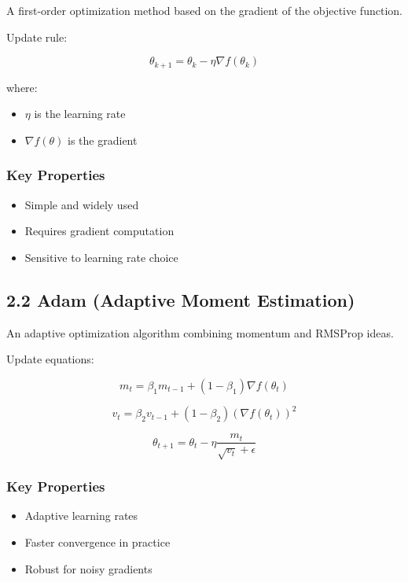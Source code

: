 A first-order optimization method based on the gradient of the objective function.

Update rule:

\[
\theta_{k+1} = \theta_k - \eta \nabla f(\theta_k)
\]

where:
\begin{itemize}
\item $\eta$ is the learning rate
\item $\nabla f(\theta)$ is the gradient
\end{itemize}

\subsubsection*{Key Properties}

\begin{itemize}
\item Simple and widely used
\item Requires gradient computation
\item Sensitive to learning rate choice
\end{itemize}

\vspace{0.3cm}

\subsection*{2.2 Adam (Adaptive Moment Estimation)}

An adaptive optimization algorithm combining momentum and RMSProp ideas.

Update equations:

\[
m_t = \beta_1 m_{t-1} + (1 - \beta_1)\nabla f(\theta_t)
\]

\[
v_t = \beta_2 v_{t-1} + (1 - \beta_2)(\nabla f(\theta_t))^2
\]

\[
\theta_{t+1} = \theta_t - \eta \frac{m_t}{\sqrt{v_t} + \epsilon}
\]

\subsubsection*{Key Properties}

\begin{itemize}
\item Adaptive learning rates
\item Faster convergence in practice
\item Robust for noisy gradients
\end{itemize}

